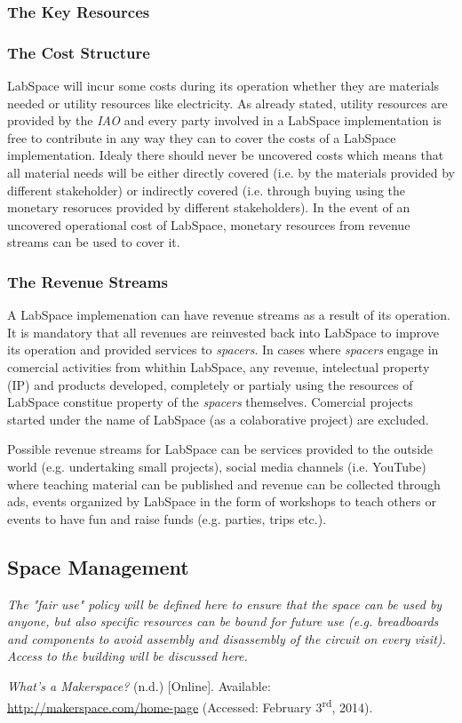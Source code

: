 \documentclass[a4paper, 11pt]{article}
\begin{document}
\subsubsection{The Key Resources} \label{sec:bm_res}

\subsubsection{The Cost Structure}

LabSpace will incur some costs during its operation whether they are materials needed or utility resources like electricity. As already stated, utility resources are provided by the \textit{IAO} and every party involved in a LabSpace implementation is free to contribute in any way they can to cover the costs of a LabSpace implementation. Idealy there should never be uncovered costs which means that all material needs will be either directly covered (i.e. by the materials provided by different stakeholder) or indirectly covered (i.e. through buying using the monetary resoruces provided by different stakeholders). In the event of an uncovered operational cost of LabSpace, monetary resources from revenue streams can be used to cover it.


\subsubsection{The Revenue Streams}

A LabSpace implemenation can have revenue streams as a result of its operation. It is mandatory that all revenues are reinvested back into LabSpace to improve its operation and provided services to \textit{spacers}. In cases where \textit{spacers} engage in comercial activities from whithin LabSpace, any revenue, intelectual property (IP) and products developed, completely or partialy using the resources of LabSpace constitue property of the \textit{spacers} themselves. Comercial projects started under the name of LabSpace (as a colaborative project) are excluded.

Possible revenue streams for LabSpace can be services provided to the outside world (e.g. undertaking small projects), social media channels (i.e. YouTube) where teaching material can be published and revenue can be collected through ads, events organized by LabSpace in the form of workshops to teach others or events to have fun and raise funds (e.g. parties, trips etc.).

\subsection{Space Management}
\textit{The "fair use" policy will be defined here to ensure that the space can be used by anyone, but also specific resources can be bound for future use (e.g. breadboards and components to avoid assembly and disassembly of the circuit on every visit). Access to the building will be discussed here.}

\newpage

\begin{thebibliography}{9}
     \emph{What’s a Makerspace?} (n.d.) [Online]. Available: \\ \href{http://makerspace.com/home-page}{http://makerspace.com/home-page} (Accessed: February 3\textsuperscript{rd}, 2014).
\end{thebibliography}
\end{document}
